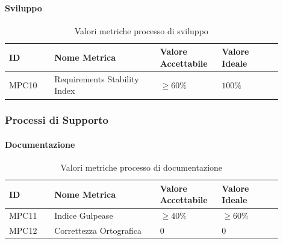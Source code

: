 \documentclass[a4paper,12pt]{article}
\begin{document}
                    \paragraph{Sviluppo} \mbox{}

                        \begin{longtable}{|M{0.15\linewidth}|M{0.35\linewidth}|M{0.2\linewidth}|M{0.2\linewidth}|}

                        \caption{Valori metriche processo di sviluppo} \\
                        \hline
                        \textbf{ID} & \textbf{Nome Metrica} & \textbf{Valore Accettabile} & \textbf{Valore Ideale} \\
                        \hline
                        \endhead

                        MPC10 & Requirements Stability Index & $\ge 60\%$ & $100\%$ \\
                        \hline

                    \end{longtable}


            \subsubsection{Processi di Supporto}
                \paragraph{Documentazione} \mbox{}
                    \begin{longtable}{|M{0.15\linewidth}|M{0.35\linewidth}|M{0.2\linewidth}|M{0.2\linewidth}|}

                        \caption{Valori metriche processo di documentazione} \\
                        \hline
                        \textbf{ID} & \textbf{Nome Metrica} & \textbf{Valore Accettabile} & \textbf{Valore Ideale} \\
                        \hline
                        \endhead

                        MPC11 & Indice Gulpease & $\ge 40\%$ & $\ge 60\%$ \\
                        \hline

                        MPC12 & Correttezza Ortografica & $0$ & $0$ \\
                        \hline

                    \end{longtable}
\end{document}
